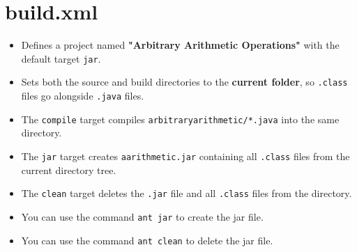 \documentclass{article}
\begin{document}
\section*{build.xml}
\begin{itemize}
    \item Defines a project named \textbf{"Arbitrary Arithmetic Operations"} with the default target \texttt{jar}.
    \item Sets both the source and build directories to the \textbf{current folder}, so \texttt{.class} files go alongside \texttt{.java} files.
    \item The \texttt{compile} target compiles \texttt{arbitraryarithmetic/*.java} into the same directory.
    \item The \texttt{jar} target creates \texttt{aarithmetic.jar} containing all \texttt{.class} files from the current directory tree.
    \item The \texttt{clean} target deletes the \texttt{.jar} file and all \texttt{.class} files from the directory.
    \item You can use the command \texttt{ant jar} to create the jar file.
    \item You can use the command \texttt{ant clean} to delete the jar file.
\end{itemize}
\end{document}

